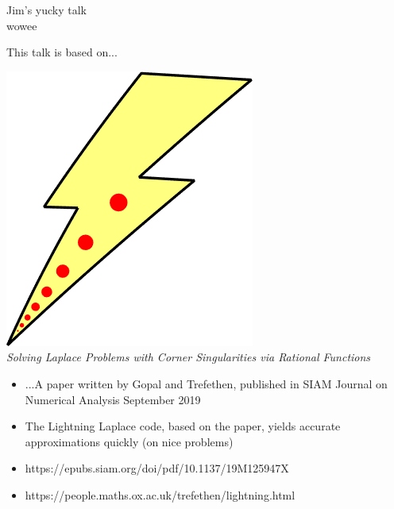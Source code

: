\documentclass{seminar}
\begin{document}
 
\pagestyle{headings}
\centerslidesfalse

\begin{slide} %
\begin{center}
Jim's yucky talk \\
wowee
\end{center}
\end{slide} %




\begin{slide} %
\large This talk is based on...\small
\begin{center}
	\includegraphics[scale=0.2]{./PNG/llogo}\\
	\small
	\emph{Solving Laplace Problems with Corner Singularities via Rational Functions}
\end{center}

\begin{itemize}
	\item ...A paper written by Gopal and Trefethen, published in SIAM Journal on Numerical Analysis September 2019
	\item The Lightning Laplace code, based on the paper, yields accurate approximations quickly (on nice problems)
	\item https://epubs.siam.org/doi/pdf/10.1137/19M125947X
	\item https://people.maths.ox.ac.uk/trefethen/lightning.html
\end{itemize}
\end{slide} %
\end{document}
